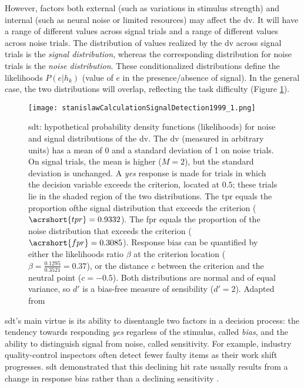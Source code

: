 However, factors both external (such as variations in stimulus strength) and internal (such as neural noise or limited resources) may affect the \acrshort{dv}. It will have a range of different values across signal trials and a range of different values across noise trials. The distribution of values realized by the \acrshort{dv} across signal trials is the \textit{signal distribution}, whereas the corresponding distribution for noise trials is the \textit{noise distribution}. These conditionalized distributions define the likelihoods $P(e|h_k)$ (value of $e$ in the presence/absence of signal). In the general case, the two distributions will overlap, reflecting the task difficulty (Figure \ref{figure:sdt}).

\begin{figure}[ht]
    \centering
    \texttt{[image: stanislawCalculationSignalDetection1999\_1.png]}
    \caption[\acrlong{sdt}: graphical formalism]{\acrlong{sdt}: hypothetical probability density functions (likelihoods) for noise and signal distributions of the \acrlong{dv}. The \acrshort{dv} (measured in arbitrary units) has a mean of 0 and a standard deviation of 1 on noise trials. On signal trials, the mean is higher ($M = 2$), but the standard deviation is unchanged. A \textit{yes} response is made for trials in which the decision variable exceeds the criterion, located at $0.5$; these trials lie in the shaded region of the two distributions. The \acrlong{tpr} equals the proportion ofthe signal distribution that exceeds the criterion ($\acrshort{tpr} = 0.9332$). The \acrlong{fpr} equals the proportion of the noise distribution that exceeds the criterion ($\acrshort{fpr} = 0.3085$). Response bias can be quantified by either the likelihoods ratio $\beta$ at the criterion location ($\beta = \frac{0.1295}{0.3521} = 0.37$), or the distance $c$ between the criterion and the neutral point ($c = -0.5$). Both distributions are normal and of equal variance, so $d'$ is a bias-free measure of sensibility ($d'=2$). Adapted from \cite{myersPracticalIntroductionUsing2022}}
    \label{figure:sdt}
\end{figure}

\acrlong{sdt}'s main virtue is its ability to disentangle two factors in a decision process: the tendency towards responding \textit{yes} regarless of the stimulus, called \textit{bias}, and the ability to distinguish signal from noise, called \gls{sensitivity}. For example, industry quality-control inspectors often detect fewer faulty items as their work shift progresses. \Acrshort{sdt} demonstrated that this declining hit rate usually results from a change in response bias rather than a declining \gls{sensitivity} .

